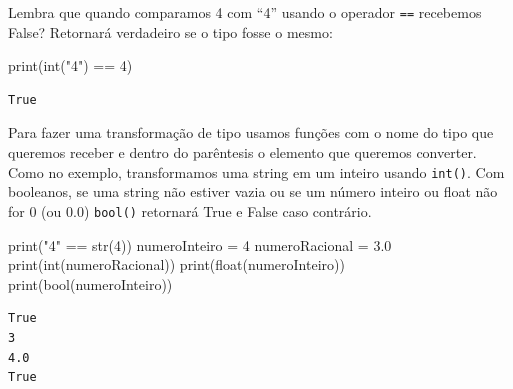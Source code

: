 \documentclass[
  letterpaper,
  DIV=11,
  numbers=noendperiod]{scrreprt}
\newenvironment{Shaded}{\begin{snugshade}}{\end{snugshade}}
\newcommand{\BuiltInTok}[1]{\textcolor[rgb]{0.00,0.23,0.31}{#1}}
\newcommand{\DecValTok}[1]{\textcolor[rgb]{0.68,0.00,0.00}{#1}}
\newcommand{\FloatTok}[1]{\textcolor[rgb]{0.68,0.00,0.00}{#1}}
\newcommand{\NormalTok}[1]{\textcolor[rgb]{0.00,0.23,0.31}{#1}}
\newcommand{\OperatorTok}[1]{\textcolor[rgb]{0.37,0.37,0.37}{#1}}
\newcommand{\StringTok}[1]{\textcolor[rgb]{0.13,0.47,0.30}{#1}}
\begin{document}
Lembra que quando comparamos 4 com ``4'' usando o operador \texttt{==}
recebemos False? Retornará verdadeiro se o tipo fosse o mesmo:

\begin{Shaded}
\begin{Highlighting}[]
    \BuiltInTok{print}\NormalTok{(}\BuiltInTok{int}\NormalTok{(}\StringTok{"4"}\NormalTok{) }\OperatorTok{==} \DecValTok{4}\NormalTok{)}
\end{Highlighting}
\end{Shaded}

\begin{tcolorbox}[enhanced jigsaw, breakable, leftrule=.75mm, left=2mm, opacityback=0, bottomrule=.15mm, toprule=.15mm, rightrule=.15mm, arc=.35mm, colback=white]

\begin{verbatim}
True
\end{verbatim}

\end{tcolorbox}

Para fazer uma transformação de tipo usamos funções com o nome do tipo
que queremos receber e dentro do parêntesis o elemento que queremos
converter. Como no exemplo, transformamos uma string em um inteiro
usando \texttt{int()}. Com booleanos, se uma string não estiver vazia ou
se um número inteiro ou float não for 0 (ou 0.0) \texttt{bool()}
retornará True e False caso contrário.

\begin{Shaded}
\begin{Highlighting}[]
    \BuiltInTok{print}\NormalTok{(}\StringTok{"4"} \OperatorTok{==} \BuiltInTok{str}\NormalTok{(}\DecValTok{4}\NormalTok{))}
\NormalTok{    numeroInteiro }\OperatorTok{=} \DecValTok{4}
\NormalTok{    numeroRacional }\OperatorTok{=} \FloatTok{3.0}
    \BuiltInTok{print}\NormalTok{(}\BuiltInTok{int}\NormalTok{(numeroRacional))}
    \BuiltInTok{print}\NormalTok{(}\BuiltInTok{float}\NormalTok{(numeroInteiro))}
    \BuiltInTok{print}\NormalTok{(}\BuiltInTok{bool}\NormalTok{(numeroInteiro))}
\end{Highlighting}
\end{Shaded}

\begin{tcolorbox}[enhanced jigsaw, breakable, leftrule=.75mm, left=2mm, opacityback=0, bottomrule=.15mm, toprule=.15mm, rightrule=.15mm, arc=.35mm, colback=white]

\begin{verbatim}
True
3
4.0
True
\end{verbatim}

\end{tcolorbox}
\end{document}

